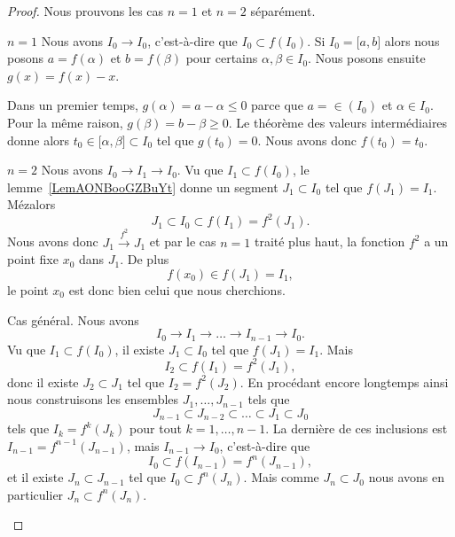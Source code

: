 \begin{proof}
    Nous prouvons les cas \( n=1\) et \( n=2\) séparément.
    \begin{subproof}
    \item[\( n=1\)]
        Nous avons \( I_0\to I_0\), c'est-à-dire que $I_0\subset f(I_0)$. Si \( I_0=\mathopen[ a , b \mathclose]\) alors nous posons \( a=f(\alpha)\) et \( b=f(\beta)\) pour certains \( \alpha,\beta\in I_0\). Nous posons ensuite \( g(x)=f(x)-x\).

        Dans un premier temps, \( g(\alpha)=a-\alpha\leq 0\) parce que \( a=\in(I_0)\) et \( \alpha\in I_0\). Pour la même raison, \( g(\beta)=b-\beta\geq 0\). Le théorème des valeurs intermédiaires donne alors \( t_0\in \mathopen[ \alpha , \beta \mathclose]\subset I_0\) tel que \( g(t_0)=0\). Nous avons donc \( f(t_0)=t_0\).
    \item[\( n=2\)]
        Nous avons \( I_0\to I_1\to I_0\). Vu que \( I_1\subset f(I_0)\), le lemme~\ref{LemAONBooGZBuYt} donne un segment \( J_1\subset I_0\) tel que \( f(J_1)=I_1\). Mézalors
        \begin{equation}
            J_1\subset I_0\subset f(I_1)=f^2(J_1).
        \end{equation}
        Nous avons donc \( J_1\stackrel{f^2}{\longrightarrow}J_1\) et par le cas \( n=1\) traité plus haut, la fonction \( f^2 \) a un point fixe \( x_0\) dans \( J_1\). De plus
        \begin{equation}
            f(x_0)\in f(J_1)=I_1,
        \end{equation}
        le point \( x_0\) est donc bien celui que nous cherchions.
    \item
        Cas général. Nous avons
        \begin{equation}
            I_0\to I_1\to\ldots\to I_{n-1}\to I_0.
        \end{equation}
        Vu que \( I_1\subset f(I_0)\), il existe \( J_1\subset I_0\) tel que \( f(J_1)=I_1\). Mais
        \begin{equation}
            I_2\subset f(I_1)=f^2(J_1),
        \end{equation}
        donc il existe \( J_2\subset J_1\) tel que \( I_2=f^2(J_2)\). En procédant encore longtemps ainsi nous construisons les ensembles \( J_1,\ldots, J_{n-1}\) tels que
        \begin{equation}
            J_{n-1}\subset J_{n-2}\subset\ldots\subset J_1\subset J_0
        \end{equation}
        tels que \( I_k=f^k(J_k)\) pour tout \( k=1,\ldots, n-1\). La dernière de ces inclusions est \( I_{n-1}=f^{n-1}(J_{n-1})\), mais \( I_{n-1}\to I_0\), c'est-à-dire que
        \begin{equation}
            I_0\subset f(I_{n-1})=f^n(J_{n-1}),
        \end{equation}
        et il existe \( J_n\subset J_{n-1}\) tel que \( I_0\subset f^n(J_n)\). Mais comme \( J_n\subset J_0\) nous avons en particulier \( J_n\subset f^n(J_n)\).


\end{subproof}
\end{proof}
